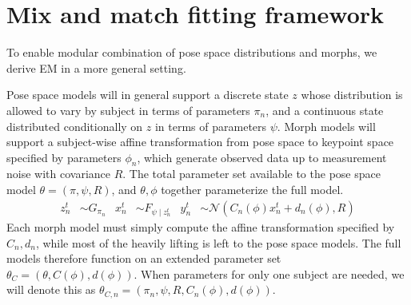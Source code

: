 \documentclass{article}         %
\newcommand{\NN}{\mathcal{N}}
\begin{document}
\section{Mix and match fitting framework}

To enable modular combination of pose space distributions and morphs, we derive EM in a more general setting.

Pose space models will in general support a discrete state $z$ whose distribution is allowed to vary by subject in terms of parameters $\pi_n$, and a continuous state distributed conditionally on $z$ in terms of parameters $\psi$. Morph models will support a subject-wise affine transformation from pose space to keypoint space specified by parameters $\phi_n$, which generate observed data up to measurement noise with covariance $R$. The total parameter set available to the pose space model $\theta = (\pi, \psi, R)$, and $\theta, \phi$ together parameterize the full model.
\begin{align}
    z^t_n &\sim G_{\pi_n} &
    x^t_n &\sim F_{\psi \mid z^t_n} &
    y^t_n &\sim \NN(C_n(\phi) x_n^t + d_n(\phi), R)
\end{align}
Each morph model must simply compute the affine transformation specified by $C_n, d_n$, while most of the heavily lifting is left to the pose space models.
The full models therefore function on an extended parameter set $\theta_C = (\theta, C(\phi), d(\phi))$. When parameters for only one subject are needed, we will
denote this as $\theta_{C,n} = (\pi_n, \psi, R, C_n(\phi), d(\phi))$.
\end{document}
